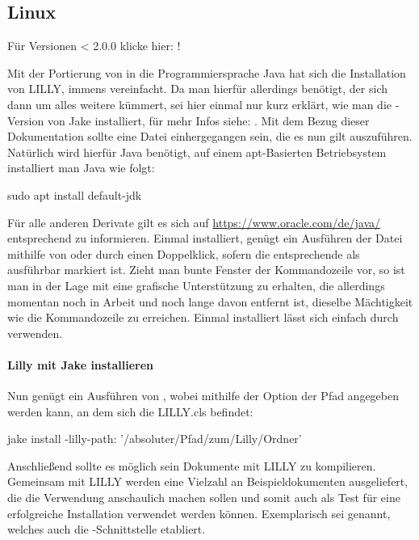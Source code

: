 \subsection{Linux}
\begin{center}
    Für Versionen < 2.0.0 klicke hier: !
\end{center}
Mit der Portierung von \Jake in die Programmiersprache Java hat sich die Installation von LILLY, immens vereinfacht.
Da man hierfür allerdings \Jake benötigt, der sich dann um alles weitere kümmert, sei hier einmal nur kurz erklärt, wie man die -Version von Jake installiert, für mehr Infos siehe: .\newline
Mit dem Bezug dieser Dokumentation sollte eine  Datei einhergegangen sein, die es nun gilt auszuführen. Natürlich wird hierfür Java benötigt, auf einem apt-Basierten Betriebsystem installiert man Java wie folgt:
\begin{bash}
sudo apt install default-jdk
\end{bash}
Für alle anderen Derivate gilt es sich auf \url{https://www.oracle.com/de/java/} entsprechend zu informieren.
Einmal installiert, genügt ein Ausführen der  Datei mithilfe von  oder durch
einen Doppelklick, sofern die entsprechende  als ausführbar markiert ist. Zieht man bunte Fenster der Kommandozeile vor, so ist man in der Lage mit \newline{} eine grafische Unterstützung zu erhalten, die allerdings momentan noch in Arbeit und noch lange davon entfernt ist, dieselbe Mächtigkeit wie die Kommandozeile zu erreichen. Einmal installiert lässt sich \Jake einfach durch  verwenden.

\paragraph{Lilly mit Jake installieren}
Nun genügt ein Ausführen von , wobei mithilfe der Option  der Pfad angegeben werden kann, an dem sich die LILLY.cls befindet:
\begin{bash}
jake install -lilly-path: '/absoluter/Pfad/zum/Lilly/Ordner'
\end{bash}
Anschließend sollte es möglich sein Dokumente mit LILLY zu kompilieren. Gemeinsam mit LILLY werden eine Vielzahl an Beispieldokumenten ausgeliefert, die die Verwendung anschaulich machen sollen und somit auch als Test für eine erfolgreiche Installation verwendet werden können.
Exemplarisch sei  genannt, welches auch die -Schnittstelle etabliert.

